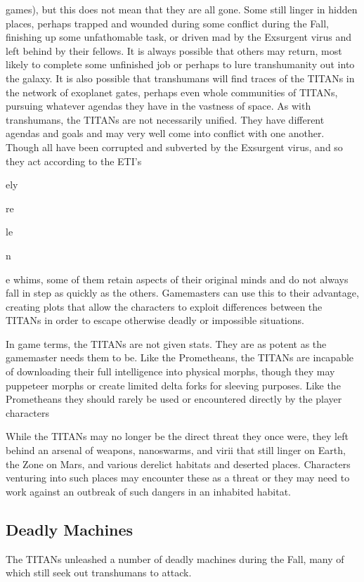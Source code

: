 games), but this does not mean that they are all gone. 
Some still linger in hidden places, perhaps trapped and 
wounded during some conflict during the Fall, finishing
up some unfathomable task, or driven mad by the
Exsurgent virus and left behind by their fellows. It is 
always possible that others may return, most likely 
to complete some unfinished job or perhaps to lure 
transhumanity out into the galaxy. It is also possible 
that transhumans will find traces of the TITANs in 
the network of exoplanet gates, perhaps even whole 
communities of TITANs, pursuing whatever agendas 
they have in the vastness of space.
As with transhumans, the TITANs are not necessarily
unified. They have different agendas and goals and
may very well come into conflict with one another. 
Though all have been corrupted and subverted by the 
Exsurgent virus, and so they act according to the ETI's 

ely 

re

le

n

e
whims, some of them retain aspects of their original 
minds and do not always fall in step as quickly as the 
others. Gamemasters can use this to their advantage, 
creating plots that allow the characters to exploit 
differences between the TITANs in order to escape 
otherwise deadly or impossible situations.

In game terms, the TITANs are not given stats. 
They are as potent as the gamemaster needs them to 
be. Like the Prometheans, the TITANs are incapable 
of downloading their full intelligence into physical 
morphs, though they may puppeteer morphs or create 
limited delta forks for sleeving purposes. Like the Prometheans
they should rarely be used or encountered
directly by the player characters

While the TITANs may no longer be the direct 
threat they once were, they left behind an arsenal of 
weapons, nanoswarms, and virii that still linger on 
Earth, the Zone on Mars, and various derelict habitats 
and deserted places. Characters venturing into such 
places may encounter these as a threat or they may 
need to work against an outbreak of such dangers in 
an inhabited habitat.

\subsection{Deadly Machines}

The TITANs unleashed a number of deadly machines 
during the Fall, many of which still seek out transhumans
to attack.

